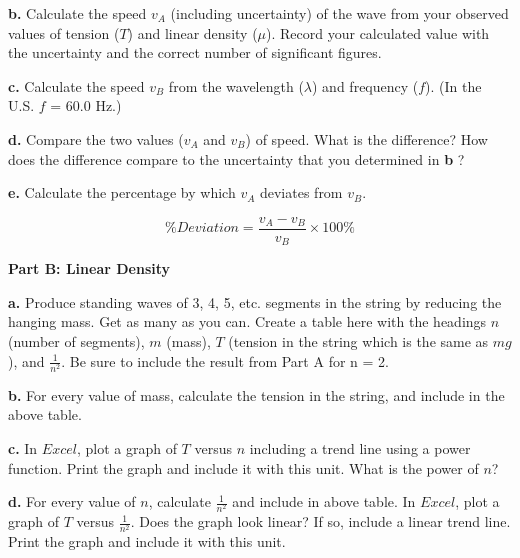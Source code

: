 \textbf{b. } Calculate the speed $v_A$ (including uncertainty) of the wave from your observed values of tension
($T$) and linear density ($\mu $). Record your calculated value with the uncertainty and the correct number of significant
figures.


\vspace{4cm}

\textbf{c. } Calculate the speed $v_B$ from the wavelength ($\lambda $) and frequency ($f$). (In the U.S. $f$ = 60.0 Hz.)

\vspace{4cm}

\textbf{d. } Compare the two values ($v_A$ and $v_B$) of speed. What is the difference? How does the difference compare
to the uncertainty that you determined in \textbf{b }?

\vspace{4cm}

\textbf{e. } Calculate the percentage by which $v_A$ deviates from $v_B$.

\begin{equation}
\% Deviation =\frac {v_A - v_B}{v_B} \times 100\%
\end{equation}

\vspace{3cm}

\newpage

\textbf{Part B: Linear Density}

\textbf{a. } Produce standing waves of 3, 4, 5, etc. segments in the string by reducing the hanging mass. Get as many as you can. Create a table
here with the headings $n$ (number of segments), $m$ (mass), $T$ (tension in the string which is the same as $mg$), and $\frac{1}{n^2}$. Be sure to
include the result from Part A for n = 2.

\vspace{6cm}

\textbf{b. } For every value of mass, calculate the tension in the string, and include in the above table.

\textbf{c. } In $Excel$, plot a graph of $T$ versus $n$ including a trend line 
using a power function. Print the graph and include it with this unit. What is 
the power of $n$?
\vspace{20mm}

\textbf{d. } For every value of $n$, calculate $\frac{1}{n^2}$ and include in above table. In $Excel$, plot a graph of $T$ versus $\frac{1}{n^2}$.
Does the graph look linear? If so, include a linear trend line. Print the graph and include it with this unit.
\vspace{20mm}

